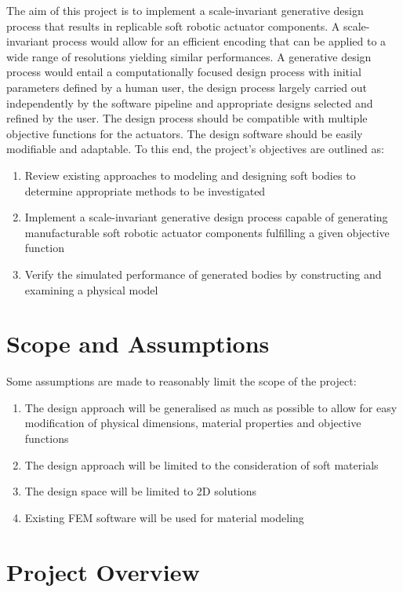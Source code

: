 The aim of this project is to implement a scale-invariant generative design process that results in replicable soft robotic actuator components. A scale-invariant process would allow for an efficient encoding that can be applied to a wide range of resolutions yielding similar performances. A generative design process would entail a computationally focused design process with initial parameters defined by a human user, the design process largely carried out independently by the software pipeline and appropriate designs selected and refined by the user. The design process should be compatible with multiple objective functions for the actuators. The design software should be easily modifiable and adaptable. To this end, the project's objectives are outlined as:

\begin{enumerate}
	\item Review existing approaches to modeling and designing soft bodies to determine appropriate methods to be investigated
	\item Implement a scale-invariant generative design process capable of generating manufacturable soft robotic actuator components fulfilling a given objective function
	\item Verify the simulated performance of generated bodies by constructing and examining a physical model
\end{enumerate}

\section{Scope and Assumptions}
\label{sec:SaA}

Some assumptions are made to reasonably limit the scope of the project:

\begin{enumerate}
	\item The design approach will be generalised as much as possible to allow for easy modification of physical dimensions, material properties and objective functions
	\item The design approach will be limited to the consideration of soft materials
	\item The design space will be limited to 2D solutions
	\item Existing FEM software will be used for material modeling
\end{enumerate}

\section{Project Overview}

